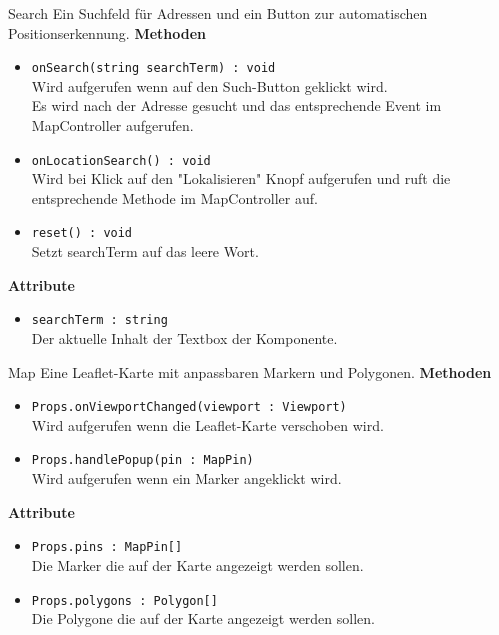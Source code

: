     \begin{Class}{Search}
        Ein Suchfeld für Adressen und ein Button zur automatischen Positionserkennung.
        \textbf{Methoden}
        \begin{itemize}
            \item \texttt{onSearch(string searchTerm) : void}
            \\ Wird aufgerufen wenn auf den Such-Button geklickt wird.
            \\ Es wird nach der Adresse gesucht und das entsprechende Event im MapController aufgerufen.
            \item \texttt{onLocationSearch() : void}
            \\ Wird bei Klick auf den "Lokalisieren" Knopf aufgerufen und ruft die entsprechende Methode im MapController auf.
            \item \texttt{reset() : void}
            \\ Setzt searchTerm auf das leere Wort.
        \end{itemize}
        \textbf{Attribute}
        \begin{itemize}
            \item \texttt{searchTerm : string}
            \\ Der aktuelle Inhalt der Textbox der Komponente.
        \end{itemize}
    \end{Class}
    
    \begin{Class}{Map}
        Eine Leaflet-Karte mit anpassbaren Markern und Polygonen.
        \textbf{Methoden}
        \begin{itemize}
            \item \texttt{Props.onViewportChanged(viewport : Viewport)}
            \\ Wird aufgerufen wenn die Leaflet-Karte verschoben wird.
            \item \texttt{Props.handlePopup(pin : MapPin)}
            \\ Wird aufgerufen wenn ein Marker angeklickt wird.
        \end{itemize}
        \textbf{Attribute}
        \begin{itemize}
            \item \texttt{Props.pins : MapPin[]}
            \\ Die Marker die auf der Karte angezeigt werden sollen.
            \item \texttt{Props.polygons : Polygon[]}
            \\ Die Polygone die auf der Karte angezeigt werden sollen.
        \end{itemize}
    \end{Class}
    

